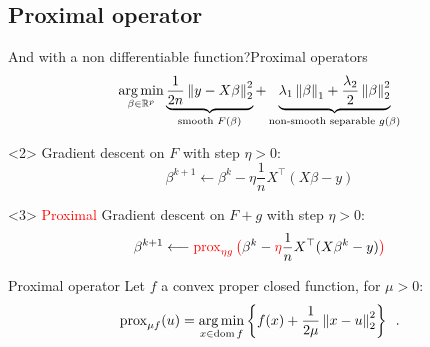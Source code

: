 \documentclass[10pt,aspectratio=43]{beamer}
\newcommand\doublerulefill{
    \leavevmode\leaders\vbox{\hrule width .1pt\kern1pt\hrule}\hfill\kern0pt
    }
\newcommand{\mytheorem}[2]{
    \doublerulefill\ \framebox{\textbf{#1}}\ \doublerulefill
    \vspace{0.1cm}
    #2
    \doublerulefill
}
\begin{document}
\subsection{Proximal operator}
\begin{frame}{And with a non differentiable function?}{Proximal operators}
\[\argmin_{\beta\in \bbR^p}
\LaTeXunderbrace{\frac{1}{2n}\norm{y-X\beta}_2^2}_{\text{smooth } F(\beta)} +
\LaTeXunderbrace{
    \lambda_1 \norm{\beta}_1 + \frac{\lambda_2}{2}\norm{\beta}_2^2}_{
\text{non-smooth separable } g(\beta)
}\]
\begin{onlyenv}<2>
Gradient descent on $F$ with step $\eta>0$:
\[\beta^{k+1} \longleftarrow \beta^k - \eta \frac{1}{n}X^\top(X\beta - y)\]
\end{onlyenv}

\begin{onlyenv}<3>
\textcolor{red}{Proximal} Gradient descent on $F+g$ with step $\eta>0$:
\[\beta^{k+1} \longleftarrow
\textcolor{red}{\operatorname{prox}_{\eta g}\big( }\beta^k -
 \textcolor{red}{\eta} \frac{1}{n}X^\top(X\beta^k - y)\textcolor{red}{\big)}\]

\begin{block}{Proximal operator}
Let $f$ a convex proper closed function, for $\mu>0$:
\begin{align*}
\operatorname{prox}_{\mu f}(u) = \mathop{\mathrm{arg\,min}}_{x\in\operatorname{dom} f}\left\{
    f(x) + \frac{1}{2\mu}\left \lVert x-u \right \rVert_2^2
\right\} \enspace.
\end{align*}
\end{block}
\end{onlyenv}

\end{frame}

\end{document}

